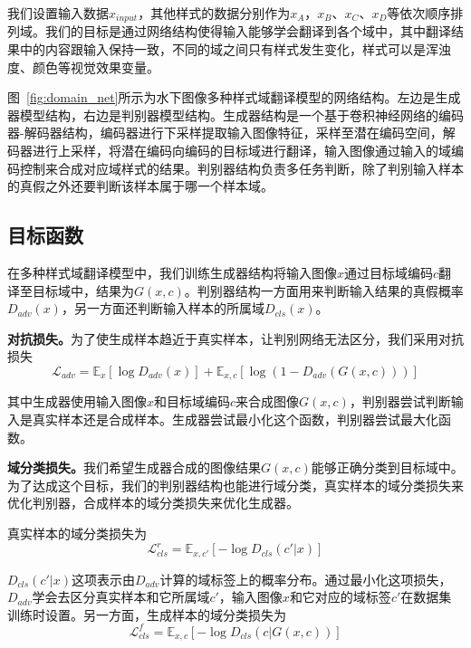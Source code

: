 我们设置输入数据$x_{input}$，其他样式的数据分别作为$x_A$，$x_B$、$x_C$、$x_D$等依次顺序排列域。我们的目标是通过网络结构使得输入能够学会翻译到各个域中，其中翻译结果中的内容跟输入保持一致，不同的域之间只有样式发生变化，样式可以是浑浊度、颜色等视觉效果变量。

图~\ref{fig:domain_net}所示为水下图像多种样式域翻译模型的网络结构。左边是生成器模型结构，右边是判别器模型结构。生成器结构是一个基于卷积神经网络的编码器-解码器结构，编码器进行下采样提取输入图像特征，采样至潜在编码空间，解码器进行上采样，将潜在编码向编码的目标域进行翻译，输入图像通过输入的域编码控制来合成对应域样式的结果。判别器结构负责多任务判断，除了判别输入样本的真假之外还要判断该样本属于哪一个样本域。

\subsection{目标函数}
在多种样式域翻译模型中，我们训练生成器结构将输入图像$x$通过目标域编码$c$翻译至目标域中，结果为$G(x,c)$。判别器结构一方面用来判断输入结果的真假概率$D_{adv}(x)$，另一方面还判断输入样本的所属域$D_{cls}(x)$。

\textbf{对抗损失。}为了使生成样本趋近于真实样本，让判别网络无法区分，我们采用对抗损失 
\begin{equation}
\label{equ:adv_exp2}
\mathcal{L}_{adv} = \mathbb{E}_x[\log D_{adv}(x)] + \mathbb{E}_{x,c}[\log(1-D_{adv}(G(x,c)))]
\end{equation}

其中生成器使用输入图像$x$和目标域编码$c$来合成图像$G(x,c)$，判别器尝试判断输入是真实样本还是合成样本。生成器尝试最小化这个函数，判别器尝试最大化函数。

\textbf{域分类损失。}我们希望生成器合成的图像结果$G(x,c)$能够正确分类到目标域中。为了达成这个目标，我们的判别器结构也能进行域分类，真实样本的域分类损失来优化判别器，合成样本的域分类损失来优化生成器。

真实样本的域分类损失为
\begin{equation}
\label{equ:cls_real_exp2}
\mathcal{L}_{cls}^{r} = \mathbb{E}_{x,c'}[-\log D_{cls}(c'|x)]
\end{equation}

$D_{cls}(c'|x)$这项表示由$D_{adv}$计算的域标签上的概率分布。通过最小化这项损失，$D_{adv}$学会去区分真实样本和它所属域$c'$，输入图像$x$和它对应的域标签$c'$在数据集训练时设置。另一方面，生成样本的域分类损失为
\begin{equation}
\label{equ:cls_fake_exp2}
\mathcal{L}_{cls}^{f} = \mathbb{E}_{x,c}[-\log D_{cls}(c|G(x,c))]
\end{equation}

